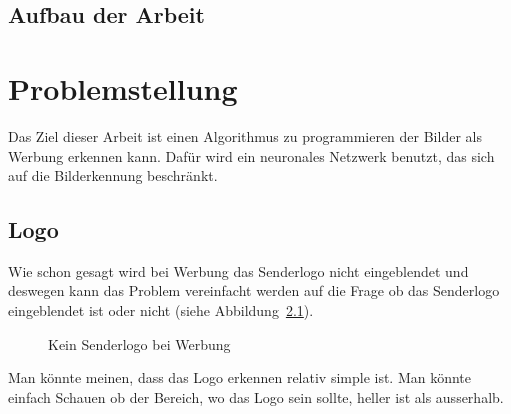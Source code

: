 \documentclass[12pt,a4paper]{report}
\begin{document}
\section{Aufbau der Arbeit}
\label{sec:aufbauDerArbeit}

\chapter{Problemstellung}
Das Ziel dieser Arbeit ist einen Algorithmus zu programmieren der Bilder als Werbung erkennen kann.
Dafür wird ein neuronales Netzwerk benutzt, das sich auf die Bilderkennung beschränkt.
\section{Logo}
Wie schon gesagt wird bei Werbung das Senderlogo nicht eingeblendet und deswegen kann das Problem
vereinfacht werden auf die Frage ob das Senderlogo eingeblendet ist oder nicht (siehe Abbildung~\ref{fig:logo1}).
\begin{figure}[h]%
    \centering
    \qquad
    \caption{Kein Senderlogo bei Werbung}%
    \label{fig:logo1}%
\end{figure}
Man könnte meinen, dass das Logo erkennen relativ simple ist.
Man könnte einfach Schauen ob der Bereich, wo das Logo sein sollte, heller ist als ausserhalb.
\end{document}
